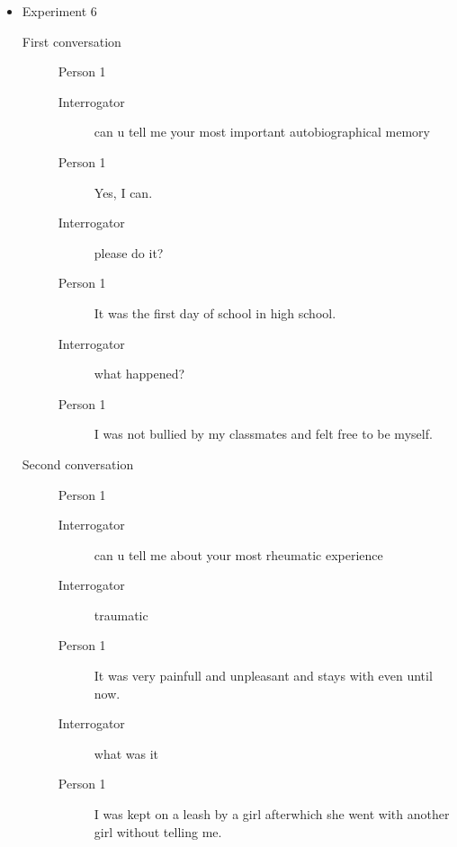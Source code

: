 \begin{itemize}
\item Experiment 6
   \begin{description}
      \item [First conversation] Person 1
         \begin{description}
            \item [Interrogator] can u tell me your most important autobiographical memory
            \item [Person 1] Yes, I can.
            \item [Interrogator] please do it?
            \item [Person 1] It was the first day of school in high school.
            \item [Interrogator] what happened?
            \item [Person 1] I was not bullied by my classmates and felt free to be myself.
         \end{description}
      \item [Second conversation] Person 1
         \begin{description}
            \item [Interrogator] can u tell me about your most rheumatic experience
            \item [Interrogator] traumatic
            \item [Person 1] It was very painfull and unpleasant and stays with even until now.
            \item [Interrogator] what was it
            \item [Person 1] I was kept on a leash by a girl afterwhich she went with another girl without telling me.
         \end{description}
   \end{description}


\end{itemize}
